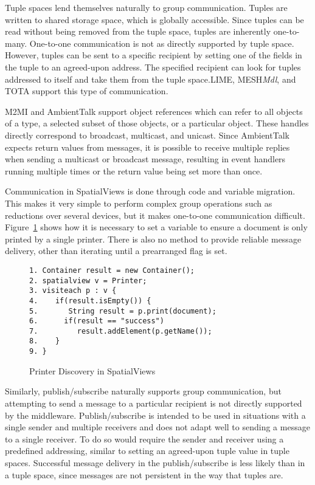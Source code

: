 \documentclass{sig-alternate}
\begin{document}
Tuple spaces lend themselves naturally to group communication. Tuples are written to shared storage space, which is globally accessible. Since tuples can be read without being removed from the tuple space, tuples are inherently one-to-many. One-to-one communication is not as directly supported by tuple space. However, tuples can be sent to a specific recipient by setting one of the fields in the tuple to an agreed-upon address. The specified recipient can look for tuples addressed to itself and take them from the tuple space.LIME, MESH\textit{Mdl}, and TOTA support this type of communication. 

M2MI and AmbientTalk support object references which can refer to all objects of a type, a selected subset of those objects, or a particular object. These handles directly correspond to broadcast, multicast, and unicast. Since AmbientTalk expects return values from messages, it is possible to receive multiple replies when sending a multicast or broadcast message, resulting in event handlers running multiple times or the return value being set more than once.

Communication in SpatialViews is done through code and variable migration. This makes it very simple to perform complex group operations such as reductions over several devices, but it makes one-to-one communication difficult. Figure~\ref{fig:svpd} shows how it is necessary to set a variable to ensure a document is only printed by a single printer. There is also no method to provide reliable message delivery, other than iterating until a prearranged flag is set.

\begin{figure}
\centering
\begin{verbatim}
1. Container result = new Container();
2. spatialview v = Printer;
3. visiteach p : v {
4.    if(result.isEmpty()) {
5.       String result = p.print(document);
6.	    if(result == "success")
7.	       result.addElement(p.getName());
8.    }
9. }
\end{verbatim}
\caption{Printer Discovery in SpatialViews}
\label{fig:svpd}
\end{figure}

Similarly, publish/subscribe naturally supports group communication, but attempting to send a message to a particular recipient is not directly supported by the middleware. Publish/subscribe is intended to be used in situations with a single sender and multiple receivers and does not adapt well to sending a message to a single receiver. To do so would require the sender and receiver using a predefined addressing, similar to setting an agreed-upon tuple value in tuple spaces. Successful message delivery in the publish/subscribe is less likely than in a tuple space, since messages are not persistent in the way that tuples are.
\end{document}
